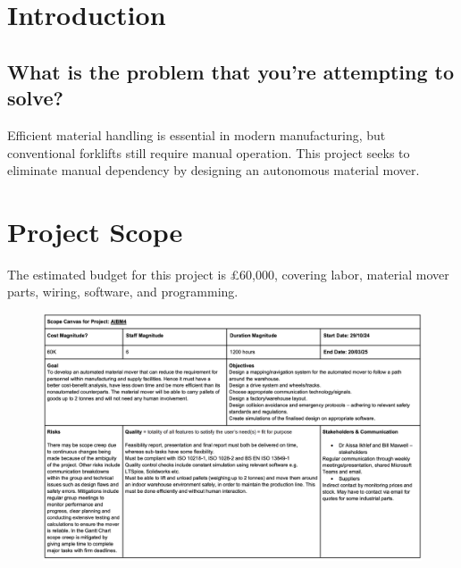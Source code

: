 \documentclass[12pt]{article}
\begin{document}
\tableofcontents

\newpage



\section{Introduction}
\subsection{What is the problem that you’re attempting to solve?}
Efficient material handling is essential in modern manufacturing, but conventional forklifts still require manual operation. This project seeks to eliminate manual dependency by designing an autonomous material mover.
 
  

 

\section{Project Scope}
The estimated budget for this project is £60,000, covering labor, material mover parts, wiring, software, and programming.


\begin{figure}[h!]
    \centering
    \includegraphics[width=1\textwidth]{scope1.png}
  \label{fig:Project Scope Document for AIBM4}
\end{figure}
\end{document}
